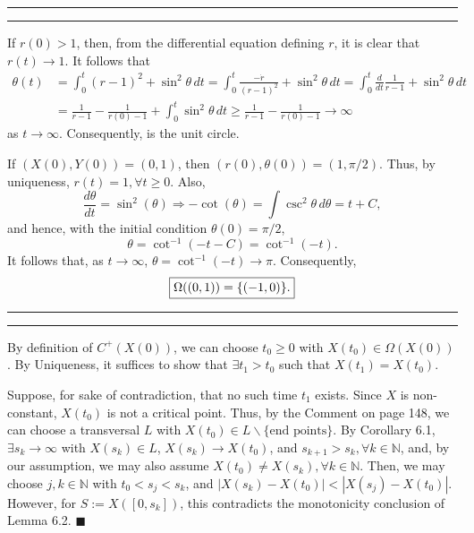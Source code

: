 \documentclass[11pt]{article}
\newcounter{questionCounter}
\newcounter{partCounter}[questionCounter]
\newenvironment{question}[2][\arabic{questionCounter}]{%
    \setcounter{partCounter}{0}%
    \vspace{.25in} \hrule \vspace{0.5em}%
        \noindent{\bf #2}%
    \vspace{0.8em} \hrule \vspace{.10in}%
    \addtocounter{questionCounter}{1}%
}{}
\renewcommand{\qed}{\quad $\blacksquare$}
\newcommand{\inv}{^{-1}}
\newcommand{\sminus}{\backslash}
\newcommand{\N}{\mathbb{N}} %
\begin{document}
\begin{question}{Problem 2}
If $r(0) > 1$, then, from the differential equation defining $r$, it is clear
that $r(t) \to 1$. It follows that
\vspace{-0.1in}
\begin{align*}
\theta(t)
 &  = \int_0^t (r - 1)^2 + \sin^2\theta \, dt
    = \int_0^t \frac{-\dot r}{(r - 1)^2} + \sin^2\theta \, dt
    = \int_0^t \frac{d}{dt} \frac{1}{r - 1} + \sin^2\theta \, dt    \\
 &  = \frac{1}{r - 1} - \frac{1}{r(0) - 1} + \int_0^t \sin^2\theta \, dt
    \geq \frac{1}{r - 1} - \frac{1}{r(0) - 1} \rightarrow \infty
\end{align*}
as $t \to \infty$. Consequently,
 is the unit circle.

If $(X(0),Y(0)) = (0,1)$, then $(r(0),\theta(0)) = (1,\pi/2)$. Thus, by
uniqueness, $r(t) = 1, \forall t \geq 0$. Also,
\[\frac{d\theta}{dt} = \sin^2(\theta)
    \Rightarrow -\cot(\theta) = \int \csc^2\theta \, d\theta = t + C,
\]
and hence, with the initial condition $\theta(0) = \pi/2$,
\[\theta = \cot\inv(-t - C) = \cot\inv(-t).\]
It follows that, as $t \to \infty$, $\theta = \cot\inv(-t) \to \pi$.
Consequently,
\[\mbox{\fbox{$\Omega((0,1)) = \{(-1,0)\}$.}}\]

\end{question}

\begin{question}{Problem 3}
By definition of $C^+(X(0))$, we can choose $t_0 \geq 0$ with
$X(t_0) \in \Omega(X(0))$. By Uniqueness, it suffices to show that
$\exists t_1 > t_0$ such that $X(t_1) = X(t_0)$.

Suppose, for sake of contradiction, that no such time $t_1$ exists. Since $X$
is non-constant, $X(t_0)$ is not a critical point. Thus, by the Comment on page
148, we can choose a transversal $L$ with
$X(t_0) \in L\sminus\{\mbox{end points}\}$. By Corollary 6.1,
$\exists s_k \to \infty$ with $X(s_k) \in L$, $X(s_k) \to X(t_0)$, and
$s_{k + 1} > s_k, \forall k \in \N$, and, by our assumption, we may also assume
$X(t_0) \neq X(s_k), \forall k \in \N$. Then, we may choose $j,k \in \N$ with
$t_0 < s_j < s_k$, and $|X(s_k) - X(t_0)| < |X(s_j) - X(t_0)|$.
However, for $S := X([0,s_k])$, this contradicts the monotonicity conclusion of
Lemma 6.2. \qed
\end{question}
\end{document}
